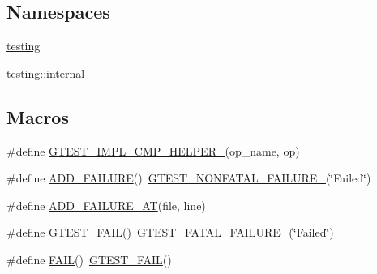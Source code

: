 \subsection*{Namespaces}
\begin{DoxyCompactItemize}
\item 
 \mbox{\hyperlink{namespacetesting}{testing}}
\item 
 \mbox{\hyperlink{namespacetesting_1_1internal}{testing\+::internal}}
\end{DoxyCompactItemize}
\subsection*{Macros}
\begin{DoxyCompactItemize}
\item 
\#define \mbox{\hyperlink{_obj__test_2lib_2googletest-release-1_88_81_2googletest_2include_2gtest_2gtest_8h_a4a5b6fbde5dd05e05dd6846ac5e5c18e}{G\+T\+E\+S\+T\+\_\+\+I\+M\+P\+L\+\_\+\+C\+M\+P\+\_\+\+H\+E\+L\+P\+E\+R\+\_\+}}(op\+\_\+name,  op)
\item 
\#define \mbox{\hyperlink{_obj__test_2lib_2googletest-release-1_88_81_2googletest_2include_2gtest_2gtest_8h_adc16b5b0a740c39084ea5c9e960e3063}{A\+D\+D\+\_\+\+F\+A\+I\+L\+U\+RE}}()~\mbox{\hyperlink{_obj__test_2lib_2googletest-release-1_88_81_2googletest_2include_2gtest_2internal_2gtest-internal_8h_a6cb7482cfa03661a91c698eb5895f642}{G\+T\+E\+S\+T\+\_\+\+N\+O\+N\+F\+A\+T\+A\+L\+\_\+\+F\+A\+I\+L\+U\+R\+E\+\_\+}}(\char`\"{}Failed\char`\"{})
\item 
\#define \mbox{\hyperlink{_obj__test_2lib_2googletest-release-1_88_81_2googletest_2include_2gtest_2gtest_8h_a448d7e5105b640e892fd8153fbee0b7f}{A\+D\+D\+\_\+\+F\+A\+I\+L\+U\+R\+E\+\_\+\+AT}}(file,  line)
\item 
\#define \mbox{\hyperlink{_obj__test_2lib_2googletest-release-1_88_81_2googletest_2include_2gtest_2gtest_8h_a636231436707c30d6778f79ae96f5dc6}{G\+T\+E\+S\+T\+\_\+\+F\+A\+IL}}()~\mbox{\hyperlink{_obj__test_2lib_2googletest-release-1_88_81_2googletest_2include_2gtest_2internal_2gtest-internal_8h_a0f9a4c3ea82cc7bf4478eaffdc168358}{G\+T\+E\+S\+T\+\_\+\+F\+A\+T\+A\+L\+\_\+\+F\+A\+I\+L\+U\+R\+E\+\_\+}}(\char`\"{}Failed\char`\"{})
\item 
\#define \mbox{\hyperlink{_obj__test_2lib_2googletest-release-1_88_81_2googletest_2include_2gtest_2gtest_8h_a3e26a8d27caa386ed0ea7ce9d5b7c4ed}{F\+A\+IL}}()~\mbox{\hyperlink{_obj__test_2lib_2googletest-release-1_88_81_2googletest_2include_2gtest_2gtest_8h_a636231436707c30d6778f79ae96f5dc6}{G\+T\+E\+S\+T\+\_\+\+F\+A\+IL}}()

\end{DoxyCompactItemize}
